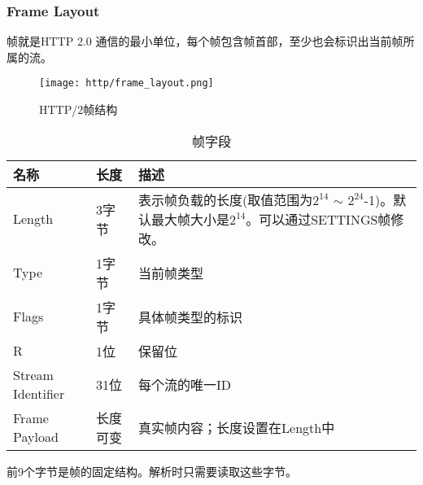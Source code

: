 \subsubsection{Frame Layout}

帧就是HTTP 2.0 通信的最小单位，每个帧包含帧首部，至少也会标识出当前帧所属的流。

\begin{figure}[H]
    \centering
    \texttt{[image: http/frame\_layout.png]}
    \caption{HTTP/2帧结构}
\end{figure}


\begin{table}[H]
    \renewcommand{\arraystretch}{2}
    \centering
    \begin{tabular} {p{70pt}p{50pt}p{250pt}}
    \hline
    名称                 & 长度      &   描述                                      \\ \hline
    Length              & 3字节     &   表示帧负载的长度(取值范围为$2^{14}$ $\sim$ $2^{24}$-1)。默认最大帧大小是$2^{14}$。可以通过SETTINGS帧修改。            \\ \hline
    Type                & 1字节     &   当前帧类型                                  \\ \hline
    Flags               & 1字节     &   具体帧类型的标识                            \\ \hline
    R                   & 1位       &   保留位                                    \\ \hline
    Stream Identifier    & 31位      &   每个流的唯一ID                             \\ \hline
    Frame Payload       & 长度可变   &   真实帧内容；长度设置在Length中               \\ \hline
    \end{tabular}
    \caption{\label{tab:table-name}帧字段}
    \end{table}


    前9个字节是帧的固定结构。解析时只需要读取这些字节。



